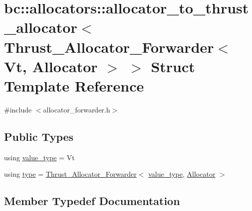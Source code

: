 \hypertarget{structbc_1_1allocators_1_1allocator__to__thrust__allocator_3_01Thrust__Allocator__Forwarder_3_01Vt_00_01Allocator_01_4_01_4}{}\section{bc\+:\+:allocators\+:\+:allocator\+\_\+to\+\_\+thrust\+\_\+allocator$<$ Thrust\+\_\+\+Allocator\+\_\+\+Forwarder$<$ Vt, Allocator $>$ $>$ Struct Template Reference}
\label{structbc_1_1allocators_1_1allocator__to__thrust__allocator_3_01Thrust__Allocator__Forwarder_3_01Vt_00_01Allocator_01_4_01_4}


{\ttfamily \#include $<$allocator\+\_\+forwarder.\+h$>$}

\subsection*{Public Types}
\begin{DoxyCompactItemize}
\item 
using \hyperlink{structbc_1_1allocators_1_1allocator__to__thrust__allocator_3_01Thrust__Allocator__Forwarder_3_01Vt_00_01Allocator_01_4_01_4_ab69955d1422c491409858fb5dc9076cb}{value\+\_\+type} = Vt
\item 
using \hyperlink{structbc_1_1allocators_1_1allocator__to__thrust__allocator_3_01Thrust__Allocator__Forwarder_3_01Vt_00_01Allocator_01_4_01_4_aab258637b8cbf8780f151b30be13bcbe}{type} = \hyperlink{structbc_1_1allocators_1_1Thrust__Allocator__Forwarder}{Thrust\+\_\+\+Allocator\+\_\+\+Forwarder}$<$ \hyperlink{structbc_1_1allocators_1_1allocator__to__thrust__allocator_3_01Thrust__Allocator__Forwarder_3_01Vt_00_01Allocator_01_4_01_4_ab69955d1422c491409858fb5dc9076cb}{value\+\_\+type}, \hyperlink{classbc_1_1allocators_1_1Allocator}{Allocator} $>$
\end{DoxyCompactItemize}


\subsection{Member Typedef Documentation}
\mbox{\label{structbc_1_1allocators_1_1allocator__to__thrust__allocator_3_01Thrust__Allocator__Forwarder_3_01Vt_00_01Allocator_01_4_01_4_aab258637b8cbf8780f151b30be13bcbe}} 
